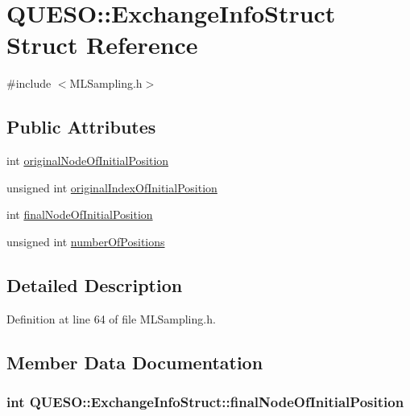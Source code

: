 \hypertarget{struct_q_u_e_s_o_1_1_exchange_info_struct}{\section{Q\-U\-E\-S\-O\-:\-:Exchange\-Info\-Struct Struct Reference}
\label{struct_q_u_e_s_o_1_1_exchange_info_struct}
}


{\ttfamily \#include $<$M\-L\-Sampling.\-h$>$}

\subsection*{Public Attributes}
\begin{DoxyCompactItemize}
\item 
int \hyperlink{struct_q_u_e_s_o_1_1_exchange_info_struct_a34d90724820b54a6e1ae0991b0ae987c}{original\-Node\-Of\-Initial\-Position}
\item 
unsigned int \hyperlink{struct_q_u_e_s_o_1_1_exchange_info_struct_a0ee7553d2094320561b274bc1fe4e546}{original\-Index\-Of\-Initial\-Position}
\item 
int \hyperlink{struct_q_u_e_s_o_1_1_exchange_info_struct_abb09fedcd6cccdc7b4ce5e331e736165}{final\-Node\-Of\-Initial\-Position}
\item 
unsigned int \hyperlink{struct_q_u_e_s_o_1_1_exchange_info_struct_a4f2b2dace4f5ef2c7f9cf047150b31f1}{number\-Of\-Positions}
\end{DoxyCompactItemize}


\subsection{Detailed Description}


Definition at line 64 of file M\-L\-Sampling.\-h.



\subsection{Member Data Documentation}
\hypertarget{struct_q_u_e_s_o_1_1_exchange_info_struct_abb09fedcd6cccdc7b4ce5e331e736165}{
\subsubsection[{final\-Node\-Of\-Initial\-Position}]{\setlength{\rightskip}{0pt plus 5cm}int Q\-U\-E\-S\-O\-::\-Exchange\-Info\-Struct\-::final\-Node\-Of\-Initial\-Position}}\label{struct_q_u_e_s_o_1_1_exchange_info_struct_abb09fedcd6cccdc7b4ce5e331e736165}


